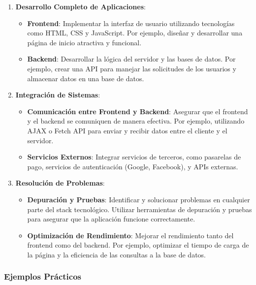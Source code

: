 \documentclass[
  letterpaper,
  DIV=11,
  numbers=noendperiod]{scrreprt}
\begin{document}
\begin{enumerate}
\def\labelenumi{\arabic{enumi}.}
\item
  \textbf{Desarrollo Completo de Aplicaciones}:

  \begin{itemize}
  \item
    \textbf{Frontend}: Implementar la interfaz de usuario utilizando
    tecnologías como HTML, CSS y JavaScript. Por ejemplo, diseñar y
    desarrollar una página de inicio atractiva y funcional.
  \item
    \textbf{Backend}: Desarrollar la lógica del servidor y las bases de
    datos. Por ejemplo, crear una API para manejar las solicitudes de
    los usuarios y almacenar datos en una base de datos.
  \end{itemize}
\item
  \textbf{Integración de Sistemas}:

  \begin{itemize}
  \item
    \textbf{Comunicación entre Frontend y Backend}: Asegurar que el
    frontend y el backend se comuniquen de manera efectiva. Por ejemplo,
    utilizando AJAX o Fetch API para enviar y recibir datos entre el
    cliente y el servidor.
  \item
    \textbf{Servicios Externos}: Integrar servicios de terceros, como
    pasarelas de pago, servicios de autenticación (Google, Facebook), y
    APIs externas.
  \end{itemize}
\item
  \textbf{Resolución de Problemas}:

  \begin{itemize}
  \item
    \textbf{Depuración y Pruebas}: Identificar y solucionar problemas en
    cualquier parte del stack tecnológico. Utilizar herramientas de
    depuración y pruebas para asegurar que la aplicación funcione
    correctamente.
  \item
    \textbf{Optimización de Rendimiento}: Mejorar el rendimiento tanto
    del frontend como del backend. Por ejemplo, optimizar el tiempo de
    carga de la página y la eficiencia de las consultas a la base de
    datos.
  \end{itemize}
\end{enumerate}

\subsubsection{\texorpdfstring{\textbf{Ejemplos
Prácticos}}{Ejemplos Prácticos}}\label{ejemplos-pruxe1cticos-1}
\end{document}
